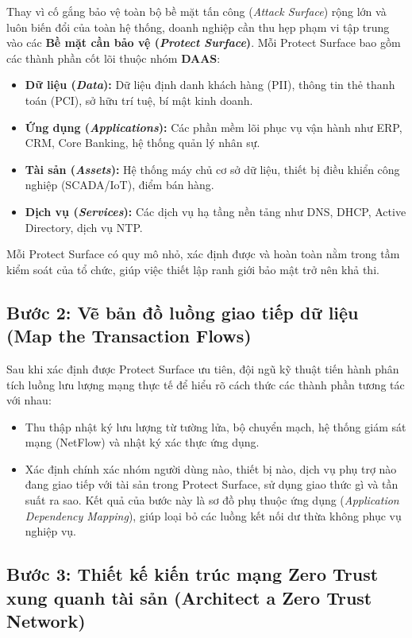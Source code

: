 Thay vì cố gắng bảo vệ toàn bộ bề mặt tấn công (\textit{Attack Surface}) rộng lớn và luôn biến đổi của toàn hệ thống, doanh nghiệp cần thu hẹp phạm vi tập trung vào các \textbf{Bề mặt cần bảo vệ (\textit{Protect Surface})}. Mỗi Protect Surface bao gồm các thành phần cốt lõi thuộc nhóm \textbf{DAAS}:
\begin{itemize}
    \item \textbf{Dữ liệu (\textit{Data}):} Dữ liệu định danh khách hàng (PII), thông tin thẻ thanh toán (PCI), sở hữu trí tuệ, bí mật kinh doanh.
    \item \textbf{Ứng dụng (\textit{Applications}):} Các phần mềm lõi phục vụ vận hành như ERP, CRM, Core Banking, hệ thống quản lý nhân sự.
    \item \textbf{Tài sản (\textit{Assets}):} Hệ thống máy chủ cơ sở dữ liệu, thiết bị điều khiển công nghiệp (SCADA/IoT), điểm bán hàng.
    \item \textbf{Dịch vụ (\textit{Services}):} Các dịch vụ hạ tầng nền tảng như DNS, DHCP, Active Directory, dịch vụ NTP.
\end{itemize}
Mỗi Protect Surface có quy mô nhỏ, xác định được và hoàn toàn nằm trong tầm kiểm soát của tổ chức, giúp việc thiết lập ranh giới bảo mật trở nên khả thi.

\subsection{Bước 2: Vẽ bản đồ luồng giao tiếp dữ liệu (Map the Transaction Flows)}
\label{subsec:5_3_2}

Sau khi xác định được Protect Surface ưu tiên, đội ngũ kỹ thuật tiến hành phân tích luồng lưu lượng mạng thực tế để hiểu rõ cách thức các thành phần tương tác với nhau:
\begin{itemize}
    \item Thu thập nhật ký lưu lượng từ tường lửa, bộ chuyển mạch, hệ thống giám sát mạng (NetFlow) và nhật ký xác thực ứng dụng.
    \item Xác định chính xác nhóm người dùng nào, thiết bị nào, dịch vụ phụ trợ nào đang giao tiếp với tài sản trong Protect Surface, sử dụng giao thức gì và tần suất ra sao. Kết quả của bước này là sơ đồ phụ thuộc ứng dụng (\textit{Application Dependency Mapping}), giúp loại bỏ các luồng kết nối dư thừa không phục vụ nghiệp vụ.
\end{itemize}

\subsection{Bước 3: Thiết kế kiến trúc mạng Zero Trust xung quanh tài sản (Architect a Zero Trust Network)}
\label{subsec:5_3_3}

